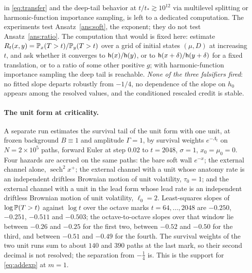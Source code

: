 in \eqref{eq:transfer} and the deep-tail behavior at
$t/t_\ast\gtrsim10^{12}$ via multilevel splitting or
harmonic-function importance sampling, is left to a dedicated
computation. The experiments test Ansatz~\ref{ans:soft}, the exponent; they do
not test Ansatz~\ref{ans:ratio}. The computation that would is fixed
here: estimate $R_t(x,y)=\mathbb{P}_x(T>t)/\mathbb{P}_y(T>t)$ over a grid of initial
states $(\mu,D)$ at increasing $t$, and ask whether it converges to
$\mathsf{h}(x)/\mathsf{h}(y)$, or to $\mathsf{h}(x+\delta)/\mathsf{h}(y+\delta)$ for a fixed
translation, or to a ratio of some other positive $g$; with
harmonic-function importance sampling the deep tail is reachable.
\emph{None of the three falsifiers fired}: no fitted slope departs robustly from
$-1/4$, no dependence of the slope on $h_0$ appears among the resolved
values, and the conditioned rescaled credit is stable.

\paragraph{The unit form at criticality.} A separate run estimates the
survival tail of the unit form with one unit, at frozen background
$B\equiv1$ and amplitude $\Gamma=1$, by survival weights $e^{-\Lambda_t}$
on $N=2\times10^5$ paths, forward Euler at step $0.02$ to $t=2048$,
$\sigma=1$, $x_0=\mu_0=0$. Four hazards are accrued on the same paths:
the bare soft wall $e^{-x}$; the external channel alone,
$\operatorname{sech}^2x^+$; the external channel with a unit whose
anatomy rate is an independent driftless Brownian motion of unit
volatility, $\tau_0=1$; and the external channel with a unit in the lead
form whose lead rate is an independent driftless Brownian motion of unit
volatility, $\ell_0=2$. Least-squares slopes of $\log\mathbb{P}(T>t)$ against
$\log t$ over the octave marks $t=64,\dots,2048$ are $-0.250$, $-0.251$,
$-0.511$ and $-0.503$; the octave-to-octave slopes over that window lie
between $-0.26$ and $-0.25$ for the first two, between $-0.52$ and
$-0.50$ for the third, and between $-0.51$ and $-0.49$ for the fourth.
The survival weights of the two unit runs sum to about $140$ and $390$
paths at the last mark, so their second decimal is not resolved; the
separation from $-\tfrac14$ is. This is the support for
\eqref{eq:addexp} at $m=1$.


